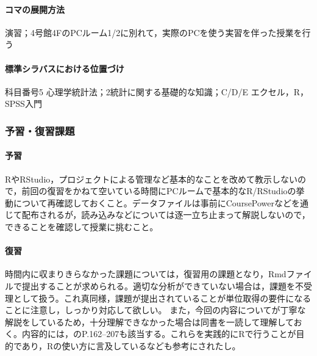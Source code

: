 \paragraph{コマの展開方法}
演習；4号館4FのPCルーム1/2に別れて，実際のPCを使う実習を伴った授業を行う
\paragraph{標準シラバスにおける位置づけ}
科目番号5 心理学統計法；2統計に関する基礎的な知識；C/D/E エクセル，R，SPSS入門
\subsubsection{予習・復習課題}
\paragraph{予習}
RやRStudio，プロジェクトによる管理など基本的なことを改めて教示しないので，前回の復習をかねて空いている時間にPCルームで基本的なR/RStudioの挙動について再確認しておくこと。データファイルは事前にCoursePowerなどを通じて配布されるが，読み込みなどについては逐一立ち止まって解説しないので，できることを確認して授業に挑むこと。
\paragraph{復習}
時間内に収まりきらなかった課題については，復習用の課題となり，Rmdファイルで提出することが求められる。適切な分析ができていない場合は，課題を不受理として扱う。これ真同様，課題が提出されていることが単位取得の要件になることに注意し，しっかり対応して欲しい。
また，今回の内容について\citet{Hashimoto201607}が丁寧な解説をしているため，十分理解できなかった場合は同書を一読して理解しておく。内容的には，\citet{Yamada2004}のP.162--207も該当する。これらを実践的にRで行うことが目的であり，Rの使い方に言及している\citet{kosugi2019}なども参考にされたし。